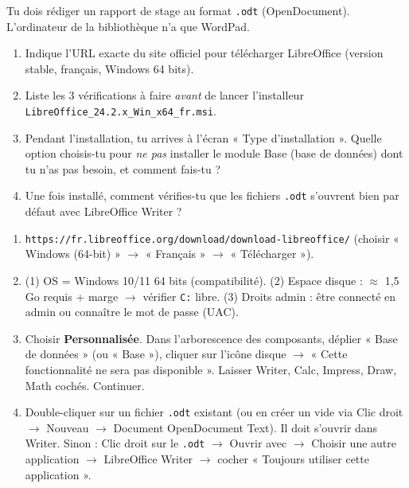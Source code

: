 \documentclass[11pt]{article}
\newcounter{popsec}
\newcounter{popsub}
\newcommand{\courssub}[1]{%
  \stepcounter{popsub}%
  \par\vspace{9pt}\noindent{\popxbold\fontsize{11.5}{13}\selectfont\color{popink}{\color{poporange}\thepopsec.\thepopsub}\hspace{6pt}#1}\par\nopagebreak\vspace{4pt}
}
\begin{document}
\courssub{Exercice d'application}

\begin{exercice}
Tu dois rédiger un rapport de stage au format \texttt{.odt} (OpenDocument). L'ordinateur de la bibliothèque n'a que WordPad.
\begin{enumerate}
    \item Indique l'URL exacte du site officiel pour télécharger LibreOffice (version stable, français, Windows 64 bits).
    \item Liste les 3 vérifications à faire \emph{avant} de lancer l'installeur \texttt{LibreOffice\_24.2.x\_Win\_x64\_fr.msi}.
    \item Pendant l'installation, tu arrives à l'écran « Type d'installation ». Quelle option choisis-tu pour \emph{ne pas} installer le module Base (base de données) dont tu n'as pas besoin, et comment fais-tu ?
    \item Une fois installé, comment vérifies-tu que les fichiers \texttt{.odt} s'ouvrent bien par défaut avec LibreOffice Writer ?
\end{enumerate}
\end{exercice}

\begin{corrige}[Exercice n°1]
\begin{enumerate}
    \item \texttt{https://fr.libreoffice.org/download/download-libreoffice/} (choisir « Windows (64-bit) » $\to$ « Français » $\to$ « Télécharger »).
    \item (1) OS = Windows 10/11 64 bits (compatibilité). (2) Espace disque : $\approx$ 1,5 Go requis + marge $\to$ vérifier \texttt{C:} libre. (3) Droits admin : être connecté en admin ou connaître le mot de passe (UAC).
    \item Choisir \textbf{Personnalisée}. Dans l'arborescence des composants, déplier « Base de données » (ou « Base »), cliquer sur l'icône disque $\to$ « Cette fonctionnalité ne sera pas disponible ». Laisser Writer, Calc, Impress, Draw, Math cochés. Continuer.
    \item Double-cliquer sur un fichier \texttt{.odt} existant (ou en créer un vide via Clic droit $\to$ Nouveau $\to$ Document OpenDocument Text). Il doit s'ouvrir dans Writer. Sinon : Clic droit sur le \texttt{.odt} $\to$ Ouvrir avec $\to$ Choisir une autre application $\to$ LibreOffice Writer $\to$ cocher « Toujours utiliser cette application ».
\end{enumerate}
\end{corrige}
\end{document}
